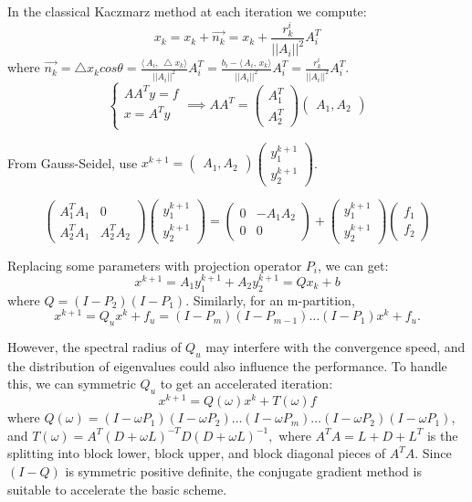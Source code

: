 \documentclass[a4paper,12pt]{article}
\begin{document}
In the classical Kaczmarz method at each iteration we compute:
$$x_k=x_k+\overrightarrow{n_k}=x_k+\frac{r_k^i}{||A_i||^2}A_i^T$$
where  $\overrightarrow{n_k}=\bigtriangleup{x_k}cos\theta=\frac{\langle\,A_i{,}\,\bigtriangleup{x_k}\rangle}{||A_i||^2}A_i^T=\frac{b_i-\langle\,A_i{,}\,x_k\rangle}{||A_i||^2}A_i^T=\frac{r_k^i}{||A_i||^2}A_i^T$.
$$
\left\{
\begin{array}{ll}
                  AA^Ty = f\\
                  x = A^Ty\\
 \end{array}
 \right.
 \implies AA^T = \begin{pmatrix} A_1^T \\ A_2^T \end{pmatrix} \begin{pmatrix} A_1, A_2 \end{pmatrix}
  $$
  
  From Gauss-Seidel, use $x^{k+1} = \begin{pmatrix} A_1, A_2 \end{pmatrix} \begin{pmatrix} y_1^{k+1} \\ y_2^{k+1} \end{pmatrix} $.
  
  $$ \begin{pmatrix} A_1^TA_1 & 0 \\ A_2^T A_1 & A_2^T A_2 \end{pmatrix} \begin{pmatrix} y_1^{k+1} \\ y_2^{k+1} \end{pmatrix} =  \begin{pmatrix} 0 & -A_1A_2 \\ 0 & 0\end{pmatrix} + \begin{pmatrix} y_1^{k+1} \\ y_2^{k+1} \end{pmatrix}\begin{pmatrix} f_1 \\ f_2 \end{pmatrix}$$
  
  Replacing some parameters with projection operator $P_i$, we can get:
  $$x^{k+1} = A_1y_1^{k+1} + A_2y_2^{k+1} = Qx_k +b$$ where $Q = (I-P_2)(I-P_1)$. Similarly, for an m-partition, $$x^{k+1} = Q_u x^k + f_u = (I-P_m)(I-P_{m-1}) \ldots (I-P_1)x^k + f_u.$$
  
  However, the spectral radius of $Q_u$ may interfere with the convergence speed, and the distribution of eigenvalues could also influence the performance. To handle this, we can symmetric $Q_u$ to get an accelerated iteration: 
  $$ x^{k+1} = Q(\omega)x^k + T(\omega) f$$ where $Q(\omega) = (I-\omega P_1)(I-\omega P_2) \ldots (I-\omega P_m) \ldots (I-\omega P_2) (I-\omega P_1)$, and $T(\omega) = A^T(D+\omega L)^{-T}D(D+\omega L)^{-1},$ where $A^TA = L+ D+L^T$ is the splitting into block lower, block upper, and block diagonal pieces of $A^TA$. Since $(I-Q)$ is symmetric positive definite, the conjugate gradient method is suitable to accelerate the basic scheme. 
  
\end{document}
